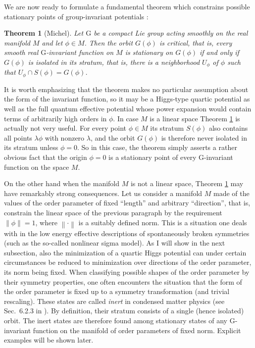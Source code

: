\documentclass[final,2p,times,12pt,sort&compress]{elsarticle}
\newcommand\gr[1]{\mathrm{#1}}              %
\newcommand\thname{Theorem}
\newtheorem{theorem}{\thname}
\newcommand\nor[1]{\left\|#1\right\|}       %
\begin{document}
We are now ready to formulate a fundamental theorem which constrains possible
stationary points of group-invariant potentials \cite{Michel:1971th}:
\begin{theorem}[Michel]
\label{thm:michel1}
Let $\gr G$ be a compact Lie group acting smoothly on the real manifold $M$ and
let $\phi\in M$. Then the orbit $G(\phi)$ is critical, that is, \emph{every
smooth real $\gr G$-invariant function on $M$ is stationary on $G(\phi)$ if and
only if $G(\phi)$ is isolated in its stratum}, that is, there is a neighborhood
$U_\phi$ of $\phi$ such that $U_\phi\cap S(\phi)=G(\phi)$.
\end{theorem}
It is worth emphasizing that the theorem makes no particular assumption about
the form of the invariant function, so it may be a Higgs-type quartic
potential as well as the full quantum effective potential whose power expansion
would contain terms of arbitrarily high orders in $\phi$. In case $M$ is a
linear space Theorem \ref{thm:michel1} is actually not very useful. For every
point $\phi\in M$ its stratum $S(\phi)$ also contains all points $\lambda\phi$
with nonzero $\lambda$, and the orbit $G(\phi)$ is therefore never isolated in
its stratum unless $\phi=0$. So in this case, the theorem simply asserts a
rather obvious fact that the origin $\phi=0$ is a stationary point of every $\gr
G$-invariant function on the space $M$.

On the other hand when the manifold $M$ is not a linear space, Theorem
\ref{thm:michel1} may have remarkably strong consequences. Let us consider a
manifold $M$ made of the values of the order parameter of fixed ``length'' and
arbitrary ``direction'', that is, constrain the linear space of the previous
paragraph by the requirement $\nor\phi=1$, where $\nor\cdot$ is a suitably
defined norm. This is a situation one deals with in the low energy effective
descriptions of spontaneously broken symmetries (such as the so-called nonlinear
sigma model). As I will show in the next subsection, also the minimization of a
quartic Higgs potential can under certain circumstances be reduced to
minimization over directions of the order parameter, its norm being fixed. When
classifying possible shapes of the order parameter by their symmetry properties,
one often encounters the situation that the form of the order parameter is fixed
up to a symmetry transformation (and trivial rescaling). These states are called
\emph{inert} in condensed matter physics (see Sec.~6.2.3 in
\cite{Vollhardt:1990vw}). By definition, their stratum consists of a single
(hence isolated) orbit. The inert states are therefore found among stationary
states of any $\gr G$-invariant function on the manifold of order parameters of
fixed norm. Explicit examples will be shown later.
\end{document}
